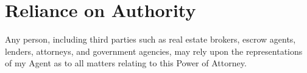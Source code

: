 
\section{Reliance on Authority}
\label{sec:reliance}

Any person, including third parties such as real estate brokers, escrow agents, lenders, attorneys, and government agencies, may rely upon the representations of my Agent as to all matters relating to this Power of Attorney.

